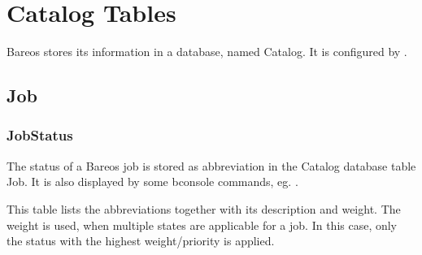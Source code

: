 \chapter{Catalog Tables}

Bareos stores its information in a database, named Catalog.
It is configured by .

\section{Job}

\subsection{JobStatus}
\label{jobstatus}


The status of a Bareos job is stored as abbreviation 
in the Catalog database table Job.
It is also displayed by some bconsole commands, eg. .

This table lists the abbreviations together with its description and weight.
The weight is used, when multiple states are applicable for a job. 
In this case, only the status with the highest weight/priority is applied.

